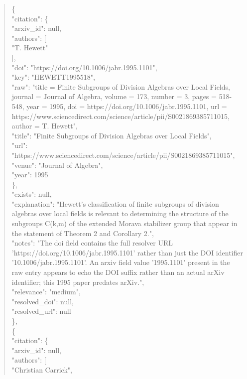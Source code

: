 \documentclass[11pt]{article}
\begin{document}
\begin{quote}
    \{\\
      "citation": \{\\
        "arxiv\_id": null,\\
        "authors": [\\
          "T. Hewett"\\
        ],\\
        "doi": "https://doi.org/10.1006/jabr.1995.1101",\\
        "key": "HEWETT1995518",\\
        "raw": "title = Finite Subgroups of Division Algebras over Local Fields, journal = Journal of Algebra, volume = 173, number = 3, pages = 518-548, year = 1995, doi = https://doi.org/10.1006/jabr.1995.1101, url = https://www.sciencedirect.com/science/article/pii/S0021869385711015, author = T. Hewett",\\
        "title": "Finite Subgroups of Division Algebras over Local Fields",\\
        "url": "https://www.sciencedirect.com/science/article/pii/S0021869385711015",\\
        "venue": "Journal of Algebra",\\
        "year": 1995\\
      \},\\
      "exists": null,\\
      "explanation": "Hewett's classification of finite subgroups of division algebras over local fields is relevant to determining the structure of the subgroups C(k,m) of the extended Morava stabilizer group that appear in the statement of Theorem 2 and Corollary 2.",\\
      "notes": "The doi field contains the full resolver URL 'https://doi.org/10.1006/jabr.1995.1101' rather than just the DOI identifier '10.1006/jabr.1995.1101'. An arxiv field value '1995.1101' present in the raw entry appears to echo the DOI suffix rather than an actual arXiv identifier; this 1995 paper predates arXiv.",\\
      "relevance": "medium",\\
      "resolved\_doi": null,\\
      "resolved\_url": null\\
    \},\\
    \{\\
      "citation": \{\\
        "arxiv\_id": null,\\
        "authors": [\\
          "Christian Carrick",\\

\end{quote}
\end{document}
